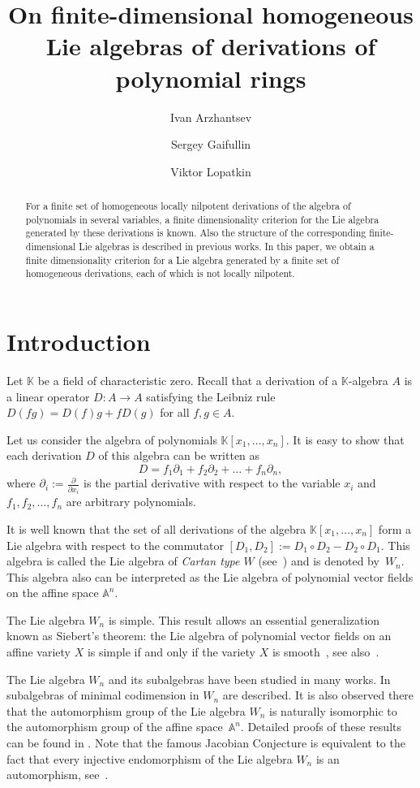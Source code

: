 \documentclass[a4paper, 12pt,oneside,reqno]{amsart}
\title{On finite-dimensional homogeneous Lie algebras of derivations of polynomial rings}
\author{Ivan Arzhantsev}
\author{Sergey Gaifullin}
\author{Viktor Lopatkin}
\numberwithin{equation}{section}
\theoremstyle{definition}
\begin{document}
%
\maketitle
\begin{abstract}
For a finite set of homogeneous locally nilpotent derivations of the algebra of polynomials in several variables, a finite dimensionality criterion for the Lie algebra generated by these derivations is known. Also the structure of the corresponding finite-dimensional Lie algebras is described in previous works. In this paper, we obtain a  finite dimensionality criterion for a Lie algebra generated by a finite set of homogeneous derivations, each of which is not locally nilpotent.
\end{abstract}
%
\section{Introduction}

Let $\mathbb{K}$ be a field of characteristic zero. Recall that a derivation of a $\mathbb{K}$-algebra $A$ is a linear operator $D\colon A\to A$ satisfying the Leibniz rule
$D(fg)=D(f)g+fD(g)$ for all $f,g\in A$.

Let us consider the algebra of polynomials $\mathbb{K}[x_1,\ldots,x_n]$. It is easy to show that each derivation $D$ of this algebra can be written as 
\[
D=f_1\partial_1+f_2\partial_2+\ldots+f_n\partial_n,
\]
where $\partial_i:=\frac{\partial}{\partial x_i}$ is the partial derivative with respect to the variable $x_i$ and $f_1,f_2,\ldots,f_n$ are arbitrary polynomials.

It is well known that the set of all derivations of the algebra $\mathbb{K}[x_1,\ldots,x_n]$ form a Lie algebra with respect to the commutator $[D_1,D_2]:=D_1\circ D_2-D_2\circ D_1$. This algebra is called the Lie algebra of \textit{Cartan type $W$} (see~\cite{Ca}) and is denoted by~$W_n$. This algebra also can be interpreted as the Lie algebra of polynomial vector fields on the affine space $\mathbb{A}^n$.

The Lie algebra $W_n$ is simple. This result allows an essential generalization known as Siebert's theorem: the Lie algebra of polynomial vector fields on an affine variety $X$ is simple if and only if the variety $X$ is smooth~\cite{Sie}, see also~\cite{BF}.

The Lie algebra $W_n$ and its subalgebras have been studied in many works. In~\cite{Ru} subalgebras of minimal codimension in $W_n$ are described. It is also observed there that the automorphism group of the Lie algebra $W_n$ is naturally isomorphic to the automorphism group of the affine space~$\mathbb{A}^n$. Detailed proofs of these results can be found in \cite{Ba-2,KR}. Note that the famous Jacobian Conjecture is equivalent to the fact that every injective endomorphism of the Lie algebra $W_n$ is an automorphism, see~\cite{Ku,KR}.
\end{document}
